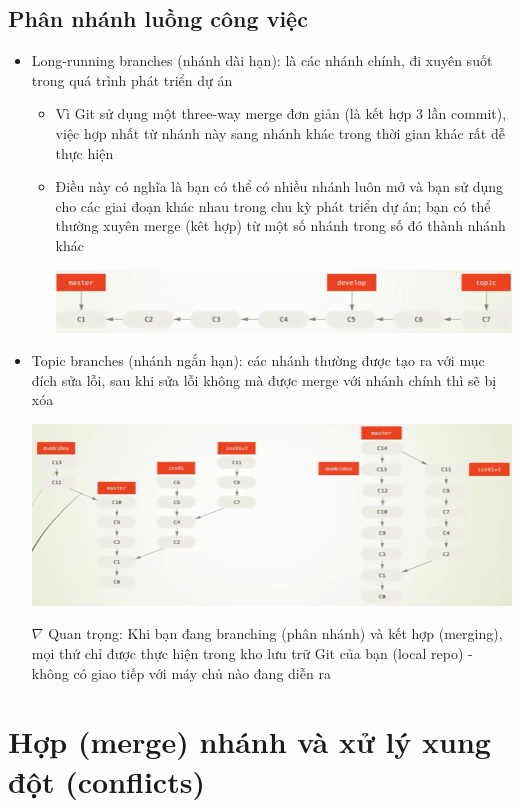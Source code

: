 \documentclass[12pt,a4paper]{report}
\begin{document}
\subsection{Phân nhánh luồng công việc} 
\begin{itemize}
\item Long-running branches (nhánh dài hạn): là các nhánh chính, đi xuyên suốt trong quá trình phát triển dự án
\begin{itemize}
\item Vì Git sử dụng một three-way merge đơn giản (là kết hợp 3 lần commit), việc hợp nhất từ nhánh này sang nhánh khác trong thời gian khác rất dễ thực hiện
\item Điều này có nghĩa là bạn có thể có nhiều nhánh luôn mở và bạn sử dụng cho các giai đoạn khác nhau trong chu kỳ phát triển dự án; bạn có thể thường xuyên merge (kêt hợp) từ một số nhánh trong số đó thành nhánh khác

	\includegraphics[width=0.8\linewidth]{screenshot058}

	\label{fig:screenshot058}
\end{itemize}
\item Topic branches (nhánh ngắn hạn): các nhánh thường được tạo ra với mục đích sửa lỗi, sau khi sửa lỗi không mà được merge với nhánh chính thì sẽ bị xóa

						\includegraphics[width=0.8\linewidth]{screenshot059}
					
						\label{fig:screenshot059}

\item[$\nabla$]Quan trọng: Khi bạn đang branching (phân nhánh) và kết hợp (merging), mọi thứ chỉ được thực hiện trong kho lưu trữ Git của bạn (local repo) - không có giao tiếp với máy chủ nào đang diễn ra
\end{itemize}				
					
\section{Hợp (merge) nhánh và xử lý xung đột (conflicts)}
\end{document}
